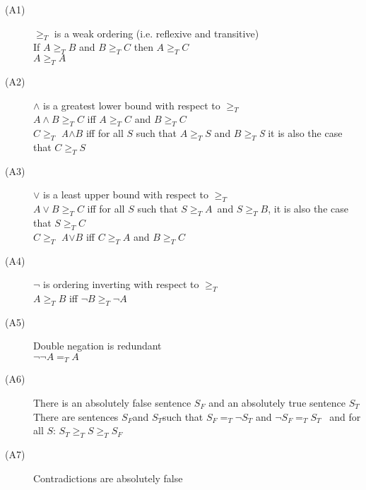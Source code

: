 \begin{description}
\item[(A1)] \(\geqslant _T\) is a weak ordering (i.e. reflexive and transitive)  \hspace*{\fill} \\
If \(A \geqslant _T B\) and \(B \geqslant _T C\) then \(A \geqslant _T C\)  \hspace*{\fill} \\
\(A \geqslant _T A\)
\item [(A2)] \(\wedge\) is a greatest lower bound with respect to \(\geqslant _T\)  \hspace*{\fill} \\
\(A \wedge B \geqslant _T C\) iff \(A \geqslant _T C\) and \(B \geqslant _T C\)  \hspace*{\fill} \\
\(C \geqslant _T\)\textit{ A}\(\wedge B\) iff for all \(S\) such that \(A \geqslant _T S\) and \(B \geqslant _T\)\textit{S }it is also the case that \(C \geqslant _T S\)
\item [(A3)]\(\vee\) is a least upper bound with respect to \(\geqslant _T\)  \hspace*{\fill} \\
\(A \vee B \geqslant _T C\) iff for all \(S\) such that \(S \geqslant _T A\)~and \(S \geqslant _T B\), it is also the case that \(S \geqslant _T C\)  \\
\(C \geqslant _T\)\textit{ A}\(\vee B\) iff \(C \geqslant _T A\) and \(B \geqslant _T C\)
\item[(A4)] \(\neg\) is ordering inverting with respect to \(\geqslant _T\)  \hspace*{\fill} \\
\(A \geqslant _T B\) iff \(\neg B \geqslant _T \neg A\)
\item [(A5)] Double negation is redundant  \hspace*{\fill} \\
\(\neg \neg A =_T A\)
\item[(A6)] There is an absolutely false sentence \(S_F\) and an absolutely true sentence \(S_T\)  \hspace*{\fill} \\
There are sentences \(S_F\)and \(S_T\)such that \(S_F =_T \neg S_T\) and \(\neg S_F =_T S_T\)~ and for all \(S\): \(S_T \geqslant _T S \geqslant _T S_F\)
\item[(A7)] Contradictions are absolutely false  \hspace*{\fill} \\

\end{description}
